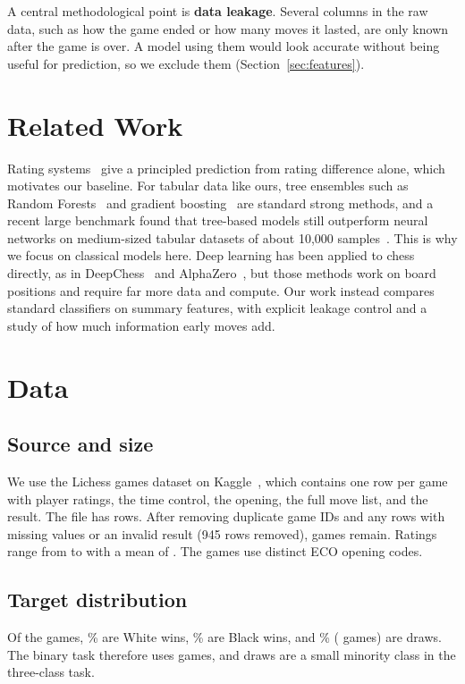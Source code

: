 \documentclass[sigconf]{acmart}
\begin{document}
A central methodological point is \textbf{data leakage}. Several columns in the raw data, such as how the game ended or how many moves it lasted, are only known after the game is over. A model using them would look accurate without being useful for prediction, so we exclude them (Section~\ref{sec:features}).

\section{Related Work}
Rating systems~\cite{elo,glicko} give a principled prediction from rating difference alone, which motivates our baseline. For tabular data like ours, tree ensembles such as Random Forests~\cite{breiman} and gradient boosting~\cite{xgboost} are standard strong methods, and a recent large benchmark found that tree-based models still outperform neural networks on medium-sized tabular datasets of about 10{,}000 samples~\cite{grinsztajn2022}. This is why we focus on classical models here. Deep learning has been applied to chess directly, as in DeepChess~\cite{deepchess} and AlphaZero~\cite{alphazero}, but those methods work on board positions and require far more data and compute. Our work instead compares standard classifiers on summary features, with explicit leakage control and a study of how much information early moves add.

\section{Data}
\subsection{Source and size}
We use the Lichess games dataset on Kaggle~\cite{kaggle}, which contains one row per game with player ratings, the time control, the opening, the full move list, and the result. The file has \nRaw{} rows. After removing duplicate game IDs and any rows with missing values or an invalid result (945 rows removed), \nGames{} games remain. Ratings range from \ratingMin{} to \ratingMax{} with a mean of \ratingMean{}. The games use \nOpenings{} distinct ECO opening codes.

\subsection{Target distribution}
Of the \nGames{} games, \pWhite\% are White wins, \pBlack\% are Black wins, and \pDraw\% (\nDraw{} games) are draws. The binary task therefore uses \nBinary{} games, and draws are a small minority class in the three-class task.
\end{document}
